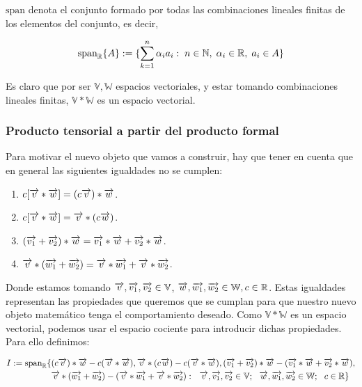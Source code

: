\begin{observacion}
	$\text{span}$ denota el conjunto formado por todas las combinaciones lineales finitas de los elementos del conjunto, es decir,

	\begin{equation}
		\text{span}_{\mathbb{R}} \{ A \} := \{ \sum_{k = 1}^n \alpha_i a_i : \; n \in \mathbb{N}, \; \alpha_i \in \mathbb{R}, \; a_i \in A \}
	\end{equation}
\end{observacion}

Es claro que por ser $\mathbb{V}, \mathbb{W}$ espacios vectoriales, y estar tomando combinaciones lineales finitas, $\mathbb{V} \ast \mathbb{W}$ es un espacio vectorial.

\subsubsection{Producto tensorial a partir del producto formal} \label{sec:cociente_prod_formal}

Para motivar el nuevo objeto que vamos a construir, hay que tener en cuenta que en general las siguientes igualdades no se cumplen:

\begin{enumerate}
	\item $c [\overrightarrow{v} \ast \overrightarrow{w}] = (c\overrightarrow{v}) \ast \overrightarrow{w}$.
	\item $c[\overrightarrow{v} \ast \overrightarrow{w}] = \overrightarrow{v} \ast (c\overrightarrow{w})$.
	\item $(\overrightarrow{v_1} + \overrightarrow{v_2}) \ast \overrightarrow{w} = \overrightarrow{v_1} \ast \overrightarrow{w} + \overrightarrow{v_2} \ast \overrightarrow{w}$.
	\item $\overrightarrow{v} \ast (\overrightarrow{w_1} + \overrightarrow{w_2}) = \overrightarrow{v} \ast \overrightarrow{w_1} + \overrightarrow{v} \ast \overrightarrow{w_2}$.
\end{enumerate}

Donde estamos tomando $\overrightarrow{v}, \overrightarrow{v_1}, \overrightarrow{v_2} \in \mathbb{V}$, $\overrightarrow{w}, \overrightarrow{w_1}, \overrightarrow{w_2} \in \mathbb{W}, c \in \mathbb{R}$. Estas igualdades representan las propiedades que queremos que se cumplan para que nuestro nuevo objeto matemático tenga el comportamiento deseado. Como $\mathbb{V} \ast \mathbb{W}$ es un espacio vectorial, podemos usar el espacio cociente para introducir dichas propiedades. Para ello definimos:

\begin{equation}
	\begin{split}
		I := \text{span}_{\mathbb{R}} \{  &
			(c\overrightarrow{v}) \ast \overrightarrow{w} - c(\overrightarrow{v} \ast \overrightarrow{w}), \overrightarrow{v} \ast (c\overrightarrow{w}) - c(\overrightarrow{v} \ast \overrightarrow{w}), (\overrightarrow{v_1} + \overrightarrow{v_2}) \ast \overrightarrow{w} - (\overrightarrow{v_1} \ast \overrightarrow{w} + \overrightarrow{v_2} \ast \overrightarrow{w}), \\
			& \overrightarrow{v} \ast (\overrightarrow{w_1} + \overrightarrow{w_2}) - (\overrightarrow{v} \ast \overrightarrow{w_1} + \overrightarrow{v} \ast \overrightarrow{w_2}): \ \  \overrightarrow{v}, \overrightarrow{v_1}, \overrightarrow{v_2} \in \mathbb{V}; \ \  \overrightarrow{w}, \overrightarrow{w_1}, \overrightarrow{w_2} \in \mathbb{W}; \ \  c \in \mathbb{R}  \}
	\end{split}
\end{equation}

